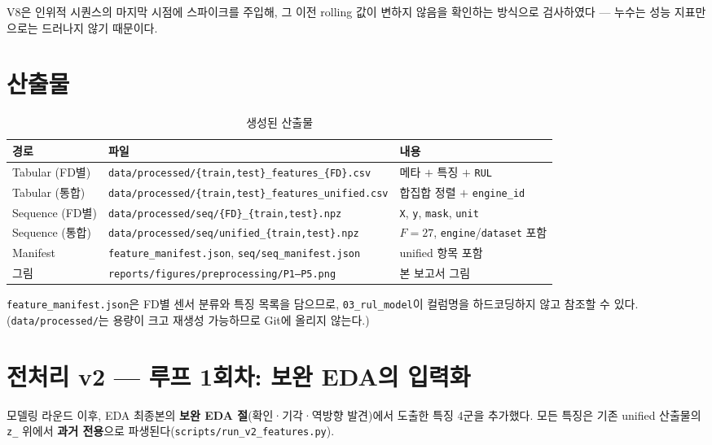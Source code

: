 \documentclass[11pt]{article}
\begin{document}
V8은 인위적 시퀀스의 마지막 시점에 스파이크를 주입해, 그 이전 rolling 값이 변하지 않음을 확인하는 방식으로 검사하였다 — 누수는 성능 지표만으로는 드러나지 않기 때문이다.

\section{산출물}

\begin{table}[H]
\centering
\caption{생성된 산출물}
\label{tab:out}
\begin{tabular}{lll}
\toprule
경로 & 파일 & 내용 \\
\midrule
Tabular (FD별) & \texttt{data/processed/\{train,test\}\_features\_\{FD\}.csv} & 메타 $+$ 특징 $+$ \texttt{RUL} \\
Tabular (통합) & \texttt{data/processed/\{train,test\}\_features\_unified.csv} & 합집합 정렬 $+$ \texttt{engine\_id} \\
Sequence (FD별) & \texttt{data/processed/seq/\{FD\}\_\{train,test\}.npz} & \texttt{X}, \texttt{y}, \texttt{mask}, \texttt{unit} \\
Sequence (통합) & \texttt{data/processed/seq/unified\_\{train,test\}.npz} & $F=27$, \texttt{engine}/\texttt{dataset} 포함 \\
Manifest & \texttt{feature\_manifest.json}, \texttt{seq/seq\_manifest.json} & unified 항목 포함 \\
그림 & \texttt{reports/figures/preprocessing/P1--P5.png} & 본 보고서 그림 \\
\bottomrule
\end{tabular}
\end{table}

\texttt{feature\_manifest.json}은 FD별 센서 분류와 특징 목록을 담으므로, \texttt{03\_rul\_model}이 컬럼명을 하드코딩하지 않고 참조할 수 있다.
(\texttt{data/processed/}는 용량이 크고 재생성 가능하므로 Git에 올리지 않는다.)

\section{전처리 v2 — 루프 1회차: 보완 EDA의 입력화}

모델링 라운드 이후, EDA 최종본의 \textbf{보완 EDA 절}(확인·기각·역방향 발견)에서 도출한 특징 4군을 추가했다.
모든 특징은 기존 unified 산출물의 \texttt{z\_} 위에서 \textbf{과거 전용}으로 파생된다(\texttt{scripts/run\_v2\_features.py}).
\end{document}
